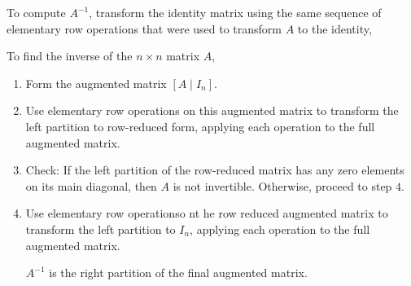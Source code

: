 To compute $A^{-1}$, transform the identity matrix using the same sequence of elementary row operations that were
used to transform $A$ to the identity,

\begin{theorem}
  To find the inverse of the $n \times n$ matrix $A$,
  \begin{enumerate}[1.]
    \item Form the augmented matrix $\left[A \mid I_{n}\right]$.
    \item Use elementary row operations on this augmented matrix to transform the left partition to 
      row-reduced form, applying each operation to the full augmented matrix.
    \item Check: If the left partition of the row-reduced matrix has any zero elements on its main diagonal, then
      $A$ is not invertible. Otherwise, proceed to step $4$.
    \item Use elementary row operationso nt he row reduced augmented matrix to transform the left partition to $I_{n}$,
      applying each operation to the full augmented matrix.

      $A^{-1}$ is the right partition of the final augmented matrix.
  \end{enumerate}
\end{theorem}





